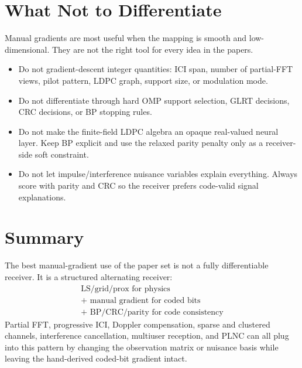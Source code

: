 \documentclass[11pt]{article}
\begin{document}
\section{What Not to Differentiate}

Manual gradients are most useful when the mapping is smooth and low-dimensional.
They are not the right tool for every idea in the papers.

\begin{itemize}
  \item Do not gradient-descent integer quantities: ICI span, number of partial-FFT views,
  pilot pattern, LDPC graph, support size, or modulation mode.
  \item Do not differentiate through hard OMP support selection, GLRT decisions,
  CRC decisions, or BP stopping rules.
  \item Do not make the finite-field LDPC algebra an opaque real-valued neural
  layer.  Keep BP explicit and use the relaxed parity penalty only as a
  receiver-side soft constraint.
  \item Do not let impulse/interference nuisance variables explain everything.
  Always score with parity and CRC so the receiver prefers code-valid signal
  explanations.
\end{itemize}

\section{Summary}

The best manual-gradient use of the paper set is not a fully differentiable
receiver.  It is a structured alternating receiver:
\begin{equation}
  \boxed{
  \begin{gathered}
  \text{LS/grid/prox for physics}\\
  {}+\text{ manual gradient for coded bits}\\
  {}+\text{ BP/CRC/parity for code consistency}
  \end{gathered}
  }
\end{equation}
Partial FFT, progressive ICI, Doppler compensation, sparse and clustered
channels, interference cancellation, multiuser reception, and PLNC can all plug
into this pattern by changing the observation matrix or nuisance basis while
leaving the hand-derived coded-bit gradient intact.
\end{document}
